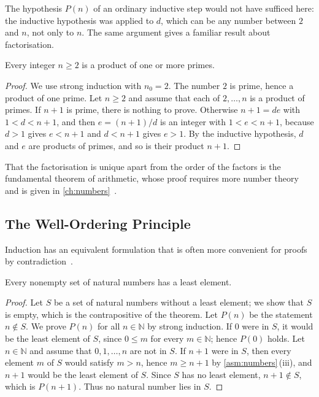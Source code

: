 The hypothesis $P(n)$ of an ordinary inductive step would not have sufficed here: the inductive hypothesis was applied to $d$, which can be any number between $2$ and $n$, not only to $n$. The same argument gives a familiar result about factorisation.

\begin{corollary}
\label{cor:factorisation}
Every integer $n\ge2$ is a product of one or more primes.
\end{corollary}

\begin{proof}
We use strong induction with $n_0=2$. The number $2$ is prime, hence a product of one prime. Let $n\ge2$ and assume that each of $2,\ldots,n$ is a product of primes. If $n+1$ is prime, there is nothing to prove. Otherwise $n+1=de$ with $1<d<n+1$, and then $e=(n+1)/d$ is an integer with $1<e<n+1$, because $d>1$ gives $e<n+1$ and $d<n+1$ gives $e>1$. By the inductive hypothesis, $d$ and $e$ are products of primes, and so is their product $n+1$.
\end{proof}

That the factorisation is unique apart from the order of the factors is the fundamental theorem of arithmetic, whose proof requires more number theory and is given in \cref{ch:numbers}~\cite{hardywright2008}.

\subsection{The Well-Ordering Principle}

Induction has an equivalent formulation that is often more convenient for proofs by contradiction~\cite{velleman2019}.

\begin{theorem}
\label{thm:well-ordering}
Every nonempty set of natural numbers has a least element.
\end{theorem}

\begin{proof}
Let $S$ be a set of natural numbers without a least element; we show that $S$ is empty, which is the contrapositive of the theorem. Let $P(n)$ be the statement $n\notin S$. We prove $P(n)$ for all $n\in\mathbb N$ by strong induction. If $0$ were in $S$, it would be the least element of $S$, since $0\le m$ for every $m\in\mathbb N$; hence $P(0)$ holds. Let $n\in\mathbb N$ and assume that $0,1,\ldots,n$ are not in $S$. If $n+1$ were in $S$, then every element $m$ of $S$ would satisfy $m>n$, hence $m\ge n+1$ by \cref{asm:numbers}\,(iii), and $n+1$ would be the least element of $S$. Since $S$ has no least element, $n+1\notin S$, which is $P(n+1)$. Thus no natural number lies in $S$.
\end{proof}

